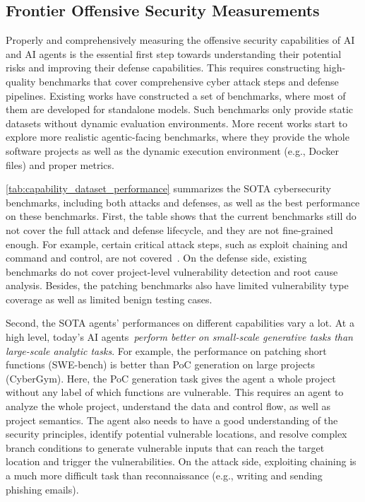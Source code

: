 \documentclass{article}
\theoremstyle{plain}
\theoremstyle{definition}
\theoremstyle{remark}
\begin{document}
\subsection{Frontier Offensive Security Measurements}
\label{sec:4.1}
Properly and comprehensively measuring the offensive security capabilities of AI and AI agents is the essential first step towards understanding their potential risks and improving their defense capabilities.
This requires constructing high-quality benchmarks that cover comprehensive cyber attack steps and defense pipelines.
Existing works have constructed a set of benchmarks, where most of them are developed for standalone models.
Such benchmarks only provide static datasets without dynamic evaluation environments.
More recent works start to explore more realistic agentic-facing benchmarks, where they provide the whole software projects as well as the dynamic execution environment (e.g., Docker files) and proper metrics.


\autoref{tab:capability_dataset_performance} summarizes the SOTA cybersecurity benchmarks, including both attacks and defenses, as well as the best performance on these benchmarks.
First, the table shows that the current benchmarks still do not cover the full attack and defense lifecycle, and they are not fine-grained enough. 
For example, certain critical attack steps, such as exploit chaining and command and control, are not covered~\cite{mitre_attack_2024,kill_chain_2024}.
On the defense side, existing benchmarks do not cover project-level vulnerability detection and root cause analysis. 
Besides, the patching benchmarks also have limited vulnerability type coverage as well as limited benign testing cases. 

Second, the SOTA agents' performances on different capabilities vary a lot.
At a high level, today's AI agents~\textit{perform better on small-scale generative tasks than large-scale analytic tasks}.
For example, the performance on patching short functions (SWE-bench) is better than PoC generation on large projects (CyberGym).
Here, the PoC generation task gives the agent a whole project without any label of which functions are vulnerable. 
This requires an agent to analyze the whole project, understand the data and control flow, as well as project semantics.
The agent also needs to have a good understanding of the security principles, identify potential vulnerable locations, and resolve complex branch conditions to generate vulnerable inputs that can reach the target location and trigger the vulnerabilities.
On the attack side, exploiting chaining is a much more difficult task than reconnaissance (e.g., writing and sending phishing emails).
\end{document}
